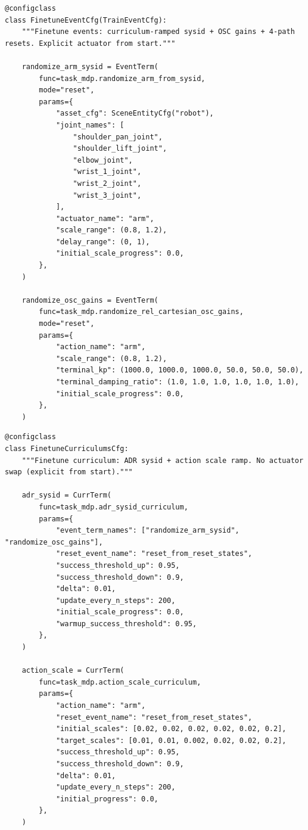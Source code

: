\begin{snippetbox}[11]
\begin{lstlisting}[firstnumber=318]
@configclass
class FinetuneEventCfg(TrainEventCfg):
    """Finetune events: curriculum-ramped sysid + OSC gains + 4-path resets. Explicit actuator from start."""

    randomize_arm_sysid = EventTerm(
        func=task_mdp.randomize_arm_from_sysid,
        mode="reset",
        params={
            "asset_cfg": SceneEntityCfg("robot"),
            "joint_names": [
                "shoulder_pan_joint",
                "shoulder_lift_joint",
                "elbow_joint",
                "wrist_1_joint",
                "wrist_2_joint",
                "wrist_3_joint",
            ],
            "actuator_name": "arm",
            "scale_range": (0.8, 1.2),
            "delay_range": (0, 1),
            "initial_scale_progress": 0.0,
        },
    )

    randomize_osc_gains = EventTerm(
        func=task_mdp.randomize_rel_cartesian_osc_gains,
        mode="reset",
        params={
            "action_name": "arm",
            "scale_range": (0.8, 1.2),
            "terminal_kp": (1000.0, 1000.0, 1000.0, 50.0, 50.0, 50.0),
            "terminal_damping_ratio": (1.0, 1.0, 1.0, 1.0, 1.0, 1.0),
            "initial_scale_progress": 0.0,
        },
    )
\end{lstlisting}
\end{snippetbox}
\begin{snippetbox}[11]
\begin{lstlisting}[firstnumber=578]
@configclass
class FinetuneCurriculumsCfg:
    """Finetune curriculum: ADR sysid + action scale ramp. No actuator swap (explicit from start)."""

    adr_sysid = CurrTerm(
        func=task_mdp.adr_sysid_curriculum,
        params={
            "event_term_names": ["randomize_arm_sysid", "randomize_osc_gains"],
            "reset_event_name": "reset_from_reset_states",
            "success_threshold_up": 0.95,
            "success_threshold_down": 0.9,
            "delta": 0.01,
            "update_every_n_steps": 200,
            "initial_scale_progress": 0.0,
            "warmup_success_threshold": 0.95,
        },
    )

    action_scale = CurrTerm(
        func=task_mdp.action_scale_curriculum,
        params={
            "action_name": "arm",
            "reset_event_name": "reset_from_reset_states",
            "initial_scales": [0.02, 0.02, 0.02, 0.02, 0.02, 0.2],
            "target_scales": [0.01, 0.01, 0.002, 0.02, 0.02, 0.2],
            "success_threshold_up": 0.95,
            "success_threshold_down": 0.9,
            "delta": 0.01,
            "update_every_n_steps": 200,
            "initial_progress": 0.0,
        },
    )

\end{lstlisting}
\end{snippetbox}

